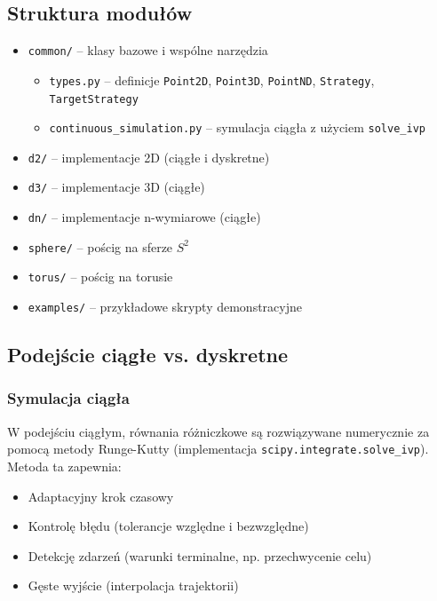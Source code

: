 \documentclass[12pt,a4paper]{article}
\begin{document}
\subsection{Struktura modułów}

\begin{itemize}
    \item \texttt{common/} -- klasy bazowe i wspólne narzędzia
    \begin{itemize}
        \item \texttt{types.py} -- definicje \texttt{Point2D}, \texttt{Point3D}, \texttt{PointND}, \texttt{Strategy}, \texttt{TargetStrategy}
        \item \texttt{continuous\_simulation.py} -- symulacja ciągła z użyciem \texttt{solve\_ivp}
    \end{itemize}
    \item \texttt{d2/} -- implementacje 2D (ciągłe i dyskretne)
    \item \texttt{d3/} -- implementacje 3D (ciągłe)
    \item \texttt{dn/} -- implementacje n-wymiarowe (ciągłe)
    \item \texttt{sphere/} -- pościg na sferze $S^2$
    \item \texttt{torus/} -- pościg na torusie
    \item \texttt{examples/} -- przykładowe skrypty demonstracyjne
\end{itemize}

\subsection{Podejście ciągłe vs. dyskretne}

\subsubsection{Symulacja ciągła}

W podejściu ciągłym, równania różniczkowe są rozwiązywane numerycznie za pomocą metody Runge-Kutty (implementacja \texttt{scipy.integrate.solve\_ivp}). Metoda ta zapewnia:
\begin{itemize}
    \item Adaptacyjny krok czasowy
    \item Kontrolę błędu (tolerancje względne i bezwzględne)
    \item Detekcję zdarzeń (warunki terminalne, np. przechwycenie celu)
    \item Gęste wyjście (interpolacja trajektorii)
\end{itemize}
\end{document}
